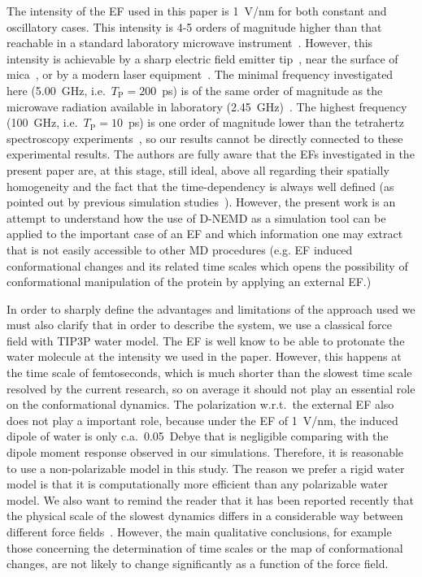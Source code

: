 \documentclass[a4paper,preprint,unsortedaddress,onecolumn]{revtex4-1}
\newcommand{\recheck}[1]{{\color{red} #1}}
\newcommand{\period}[0]{T_{\textrm{P}}}
\begin{document}
The intensity of the EF used in this paper is 1~V/nm for both constant
and oscillatory cases. This intensity is 4-5 orders of magnitude
higher than that reachable in a standard laboratory microwave
instrument~\cite{damm2012can}. However, this intensity is achievable
by a sharp electric field emitter tip~\cite{scovell2000phase}, near
the surface of mica~\cite{starzyk2013proteins}, or by a modern laser
equipment~\cite{vogel2008femtosecond}.
\recheck{The minimal frequency investigated here (5.00~GHz, i.e.~$\period = 200$~ps)
is of the same order of magnitude as the microwave
radiation available in laboratory (2.45~GHz)~\cite{damm2012can}.
The highest frequency (100~GHz, i.e.~$\period = 10$~ps) is
one order of magnitude lower than the tetrahertz spectroscopy experiments~\cite{plusquellic2007applications, born2009terahertz},
so our results cannot be directly connected to these experimental results.}
The authors are fully aware
that the EFs investigated in the present paper are, at this stage, still ideal, above all regarding their spatially homogeneity and
  the fact that the time-dependency is always well defined (as pointed
out by previous simulation studies~\cite{budi2005electric,
  budi2007effect, budi2008comparative, toschi2008effects,
  astrakas2011electric, astrakas2012structural, damm2012can,
  starzyk2013proteins, english2009nonequilibrium,
  solomentsev2012effects}). However, the present work is an attempt to understand how the use of D-NEMD as a simulation tool can be applied to the important case of an EF and which information one may extract that is not easily accessible to other MD procedures (e.g.  EF induced conformational changes and its related time scales which opens the
possibility of conformational manipulation of the protein by applying
an external EF.)

In order to sharply define the advantages and limitations of the approach used we must also clarify that in order to describe the system, we use a classical force field with TIP3P water model.
The EF is well know to be able to protonate the water molecule at the
intensity we used in the paper. However, this happens at the time
scale of femtoseconds, which is much shorter than the slowest time
scale resolved by the current research, so on average it should not play an essential role on the conformational dynamics.
The polarization w.r.t.~the external EF also does
not play a important role, because  under the EF of 1~V/nm, the induced dipole
of water is only c.a.~0.05~Debye that is negligible comparing with the
dipole moment response observed in our simulations.  Therefore, it is
reasonable to use a non-polarizable model in this study.  The reason we
prefer a rigid water model is that it is computationally more
efficient than any polarizable water model.  We also want to remind
the reader that it has been reported recently that the physical scale of the slowest
dynamics differs in a considerable way between different force
fields~\cite{vitalini2013speed}. However, the main qualitative conclusions, for
example those concerning the determination of time scales or the map of conformational changes, 
are not likely to change significantly as a function of the force field.
\end{document}
